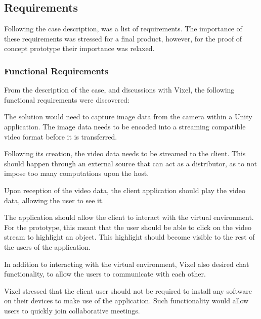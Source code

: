 \subsection{Requirements}
Following the case description, was a list of requirements. The importance of these requirements was stressed for a final product, however, for the proof of concept prototype their importance was relaxed.

\subsubsection{Functional Requirements}
From the description of the case, and discussions with Vixel, the following functional requirements were discovered:

The solution would need to capture image data from the camera within a Unity application. The image data needs to be encoded into a streaming compatible video format before it is transferred.

Following its creation, the video data needs to be streamed to the client. This should happen through an external source that can act as a distributor, as to not impose too many computations upon the host.

Upon reception of the video data, the client application should play the video data, allowing the user to see it. 

The application should allow the client to interact with the virtual environment. For the prototype, this meant that the user should be able to click on the video stream to highlight an object. This highlight should become visible to the rest of the users of the application.

In addition to interacting with the virtual environment, Vixel also desired chat functionality, to allow the users to communicate with each other.

Vixel stressed that the client user should not be required to install any software on their devices to make use of the application. Such functionality would allow users to quickly join collaborative meetings.

